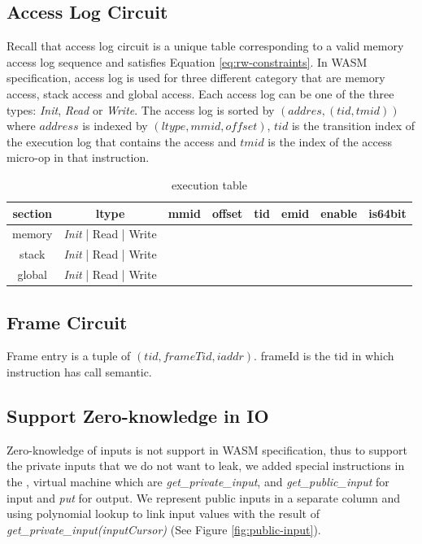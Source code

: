 \subsection{Access Log Circuit}
Recall that access log circuit is a unique table corresponding to a valid memory access log sequence and satisfies Equation \ref{eq:rw-constraints}. In WASM specification, access log is used for three different category that are memory access, stack access and global access. Each access log can be one of the three types: \emph{Init}, \emph{Read} or \emph{Write}. The access log is sorted by $(addres, (tid, tmid))$ where $address$ is indexed by $ (ltype, mmid, offset)$, $tid$ is the transition index of the execution log that contains the access and $tmid$ is the index of the access micro-op in that instruction.
\label{tbl: rw-table}
\begin{table}[!h]
\begin{center}
\begin{tabular}{ | c | c | c | c | c | c | c | c |}
  \hline
  section & ltype & mmid & offset & tid & emid & enable & is64bit\\ 
  \hline
  memory & \emph{Init} | Read | Write & & & & & &\\
  \hline
  stack & \emph{Init} | Read | Write & & & & & &\\
  \hline
  global & \emph{Init} | Read | Write & & & & & &\\
 \hline
\end{tabular}
\caption{execution table}
\label{tbl:ex-table}
\end{center}
\end{table}

\subsection{Frame Circuit}
\label{chp:frame-circuit}
Frame entry is a tuple of $(tid, frameTid, iaddr)$. 
frameId is the tid in which instruction has call semantic. 
\subsection{Support Zero-knowledge in IO}
Zero-knowledge of inputs is not support in WASM specification, thus to support the private inputs that we do not want to leak, we added special instructions in the \zkwasm, virtual machine which are \emph{get\_private\_input}, and \emph{get\_public\_input} for input and \emph{put} for output. We represent public inputs in a separate column and using polynomial lookup to link input values with the result of \emph{get\_private\_input(inputCursor)} (See Figure \ref{fig:public-input}).

